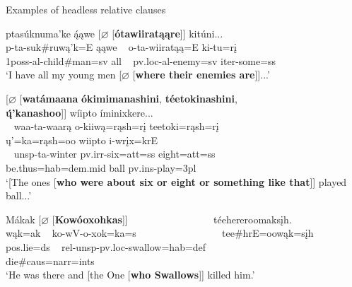 \begin{exe}
    \item\label{Ch5HeadlessRCsInCorpus} Examples of headless relative clauses

    \begin{xlist}
        \item\label{Ch5HeadlessRCsInCorpusA} \glll ptasúknuma'ke ą́ąwe \textnormal{[}$\varnothing$ \textnormal{[}\textbf{ótawiiratąąre}\textnormal{]]} kitúni...\\
        p-ta-suk\#ruwą'k=E ąąwe ~ o-ta-wiiratąą=E ki-tu=rį\\
        1poss-al-\textnormal{child}\#\textnormal{man}=sv \textnormal{all} ~ pv.loc-al-\textnormal{enemy}=sv iter-\textnormal{some}=ss\\
        \glt `I have all my young men [$\varnothing$ [\textbf{where their enemies are}]]...' \citep[56]{hollow1973a}

        \item\label{Ch5HeadlessRCsInCorpusB} \glll \textnormal{[}$\varnothing$ \textnormal{[}\textbf{watámaana} \textbf{ókimimanashini}, \textbf{téetokinashini}, ~ ~ ~ ~ ~ ~ ~ ~ ~ ~ \textbf{ų́'kanashoo}\textnormal{]]} wíipto íminixkere...\\
        ~ waa-ta-waarą o-kiiwą=rąsh=rį teetoki=rąsh=rį ~ ~ ~ ~ ~ ~ ~ ~ ~ ~ ų'=ka=rąsh=oo wiipto i-wrįx=krE\\
        ~ unsp-ta-\textnormal{winter} pv.irr-\textnormal{six}=att=ss \textnormal{eight}=att=ss ~ ~ ~ ~ ~ ~ ~ ~ ~ ~ \textnormal{be.thus}=hab=dem.mid \textnormal{ball} pv.ins-\textnormal{play}=3pl\\
        \glt `[The ones [\textbf{who were about six or eight or something like that}]] played ball...' \citep[126]{hollow1973a}

       

        \item\label{Ch5HeadlessRCsInCorpusD} \glll Mákak \textnormal{[}$\varnothing$ \textnormal{[}\textbf{Kowóoxohkas}\textnormal{]]} ~ ~ ~ ~ ~ ~ ~ ~ ~ ~ téehereroomaksįh.\\
        wąk=ak ~ ko-wV-o-xok=ka=s ~ ~ ~ ~ ~ ~ ~ ~ ~ ~ tee\#hrE=oowąk=sįh\\
        pos.lie=ds ~ rel-unsp-pv.loc-\textnormal{swallow}=hab=def ~ ~ ~ ~ ~ ~ ~ ~ ~ ~ \textnormal{die}\#caus=narr=ints\\
        \glt `He was there and [the One [\textbf{who Swallows}\footnotemark]] killed him.' \citep[97]{hollow1973a}


\end{xlist}
\end{exe}
